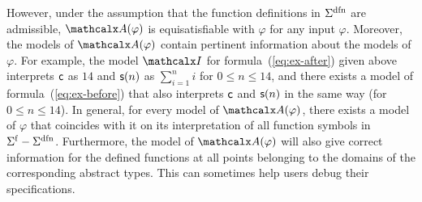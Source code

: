 However, under the assumption that the function definitions in
$\sfundefs{\Sigma}$ are admissible, %
$\conv(\varphi)$ is equisatisfiable with $\varphi$ for any input $\varphi$.
Moreover, the models of $\conv( \varphi )$ contain
pertinent information about the models of $\varphi$. For example, the model
$\I$ for formula~(\ref{eq:ex-after}) given above interprets $\mathsf{c}$ as $14$
and $\mathsf{s}(n)$ as $\sum_{i=1}^n i$ for $0 \le n \le 14$,
and there exists a model of formula~(\ref{eq:ex-before}) that also interprets
$\mathsf{c}$ and $\mathsf{s}(n)$ in the same way (for $0 \le n \le 14$).
In general, for every model of $\conv( \varphi )$,
there exists a model of $\varphi$ that
coincides with it on its interpretation of all
function symbols in $\sfuns{\Sigma} - \sfundefs{\Sigma}$.
Furthermore, the model of $\conv( \varphi )$ will
also give correct information for the defined functions at all points belonging
to the domains of the corresponding abstract types. This can sometimes help
users debug their specifications.



